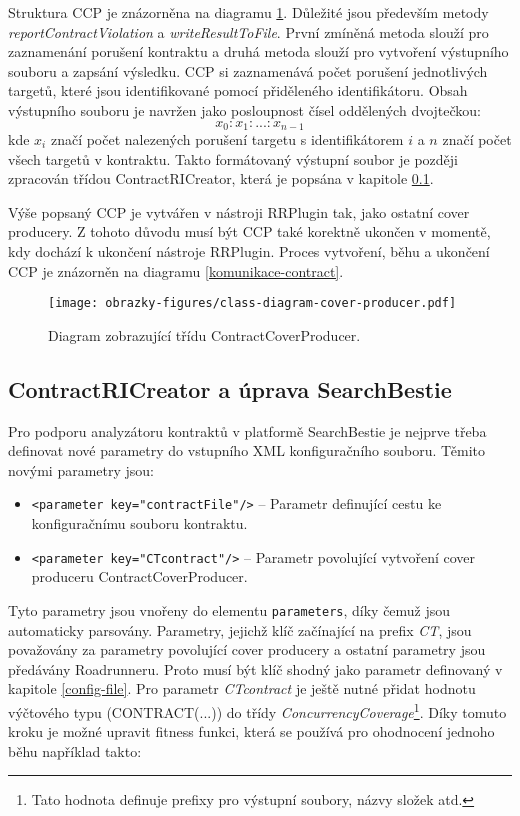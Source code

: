 Struktura CCP je znázorněna na diagramu \ref{class-cover}. Důležité jsou především metody \textit{reportContractViolation} a \textit{writeResultToFile}. První zmíněná metoda slouží pro zaznamenání porušení kontraktu a druhá metoda slouží pro vytvoření výstupního souboru a zapsání výsledku. CCP si zaznamenává počet porušení jednotlivých targetů, které jsou identifikované pomocí přiděleného identifikátoru. Obsah výstupního souboru je navržen jako posloupnost čísel oddělených dvojtečkou:
$$x_0 : x_1 : ... : x_{n-1}$$
kde $x_i$ značí počet nalezených porušení targetu s identifikátorem $i$ a $n$ značí počet všech targetů v kontraktu. Takto formátovaný výstupní soubor je později zpracován třídou ContractRICreator, která je popsána v kapitole \ref{ricreator}.

Výše popsaný CCP je vytvářen v nástroji RRPlugin tak, jako ostatní cover producery. Z tohoto důvodu musí být CCP také korektně ukončen v momentě, kdy dochází k ukončení nástroje RRPlugin. Proces vytvoření, běhu a ukončení CCP je znázorněn na diagramu \ref{komunikace-contract}.
  
\begin{figure}[!htbp]
    \texttt{[image: obrazky-figures/class-diagram-cover-producer.pdf]}
    \caption{Diagram zobrazující třídu ContractCoverProducer.}
    \label{class-cover}
\end{figure}  

\subsection{ContractRICreator a úprava SearchBestie}\label{ricreator}
Pro podporu analyzátoru kontraktů v platformě SearchBestie je nejprve třeba definovat nové parametry do vstupního XML konfiguračního souboru. Těmito novými parametry jsou:

\begin{itemize}
\item \texttt{<parameter key="contractFile"/>} -- Parametr definující cestu ke konfiguračnímu souboru kontraktu.
\item \texttt{<parameter key="CTcontract"/>} -- Parametr povolující vytvoření cover produceru ContractCoverProducer.
\end{itemize} 

Tyto parametry jsou vnořeny do elementu \texttt{parameters}, díky čemuž jsou automaticky parsovány. Parametry, jejichž klíč začínající na prefix \textit{CT}, jsou považovány za parametry povolující cover producery a ostatní parametry jsou předávány Roadrunneru. Proto musí být klíč shodný jako parametr definovaný v kapitole \ref{config-file}. Pro parametr \textit{CTcontract} je ještě nutné přidat hodnotu výčtového typu (CONTRACT(...)) do třídy \textit{ConcurrencyCoverage}\footnote{Tato hodnota definuje prefixy pro výstupní soubory, názvy složek atd.}. Díky tomuto kroku je možné upravit fitness funkci, která se používá pro ohodnocení jednoho běhu například takto:
 
